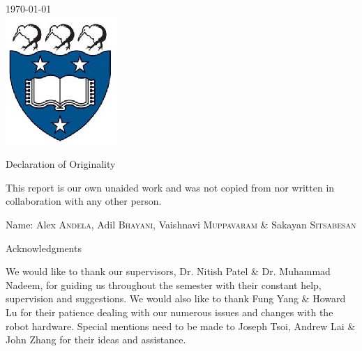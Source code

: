 \documentclass{article}
\begin{document}
\begin{titlepage}

{\large \today}\\[2cm]


\includegraphics{uoa.png}\\[1cm]
 

\vfill

\vspace*{25em}

{\Large Declaration of Originality}

\hspace{5em}

This report is our own unaided work and was not copied from nor written in collaboration with any other person.

Name: Alex \textsc{Andela}, Adil \textsc{Bhayani}, Vaishnavi \textsc{Muppavaram} \& Sakayan \textsc{Sitsabesan}

\newpage

{\Large Acknowledgments}

\hspace{5em}

We would like to thank our supervisors, Dr. Nitish Patel \& Dr. Muhammad Nadeem, for guiding us throughout the semester with their constant help, supervision and suggestions. We would also like to thank Fung Yang \& Howard Lu for their patience dealing with our numerous issues and changes with the robot hardware. Special mentions need to be made to Joseph Tsoi, Andrew Lai \& John Zhang for their ideas and assistance.

\end{titlepage}
\end{document}
